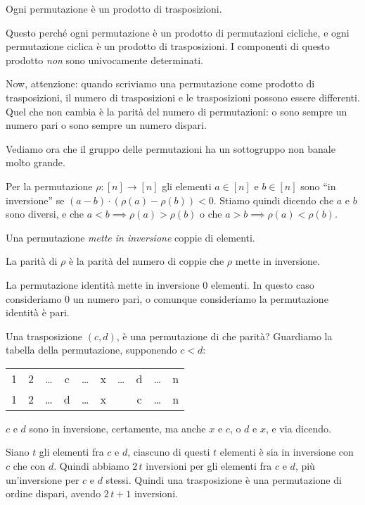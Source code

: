 \begin{prop}
	Ogni permutazione \`e un prodotto di trasposizioni.
\end{prop}

Questo perch\'e ogni permutazione \`e un prodotto di permutazioni cicliche, e ogni permutazione ciclica \`e un prodotto di trasposizioni.
I componenti di questo prodotto \emph{non} sono univocamente determinati.

Now, attenzione: quando scriviamo una permutazione come prodotto di trasposizioni, il numero di trasposizioni e le trasposizioni possono essere differenti.
Quel che non cambia \`e la parit\`a del numero di permutazioni: o sono sempre un numero pari o sono sempre un numero dispari.

Vediamo ora che il gruppo delle permutazioni ha un sottogruppo non banale molto grande.

\begin{defn}
	Per la permutazione $\rho : [n] \to [n]$ gli elementi $a \in [n]$ e $b \in [n]$ sono ``in inversione'' se $(a - b) \cdot (\rho(a) - \rho(b)) < 0$.
	Stiamo quindi dicendo che $a$ e $b$ sono diversi, e che $a < b \implies \rho(a) > \rho(b)$ o che $a > b \implies \rho(a) < \rho(b)$.
\end{defn}

Una permutazione \emph{mette in inversione} coppie di elementi.

\begin{defn}
	La parit\`a di $\rho$ \`e la parit\`a del numero di coppie che $\rho$ mette in inversione.
\end{defn}

La permutazione identit\`a mette in inversione 0 elementi.
In questo caso consideriamo 0 un numero pari, o comunque consideriamo la permutazione identit\`a \`e pari.

Una trasposizione $(c,d)$, \`e una permutazione di che parit\`a?
Guardiamo la tabella della permutazione, supponendo $c < d$:

\begin{tabular}{*{10}{c}}
	1 & 2 & \dots & c & \dots & x & \dots & d & \dots & n \\
	1 & 2 & \dots & d & \dots & x &  & c & \dots & n
\end{tabular}

$c$ e $d$ sono in inversione, certamente, ma anche $x$ e $c$, o $d$ e $x$, e via dicendo.

Siano $t$ gli elementi fra $c$ e $d$, ciascuno di questi $t$ elementi \`e sia in inversione con $c$ che con $d$.
Quindi abbiamo $2 \, t$ inversioni per gli elementi fra $c$ e $d$, pi\`u un'inversione per $c$ e $d$ stessi.
Quindi una trasposizione \`e una permutazione di ordine dispari, avendo $2 \, t + 1$ inversioni.

